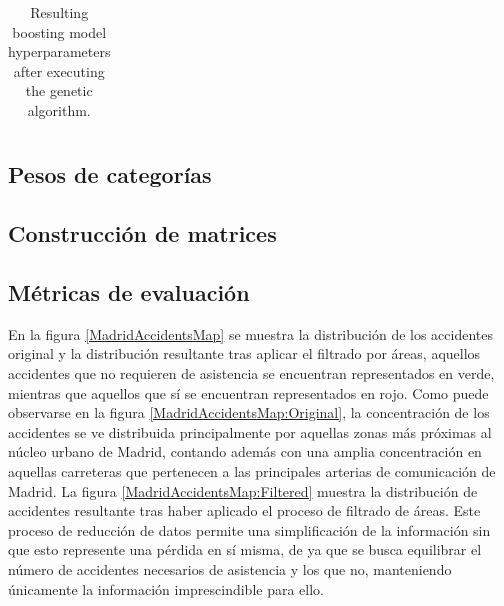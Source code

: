 \documentclass{uathesis-es}
\begin{document}
{\begin{table}[H]
\begin{center}
\begin{tabular}{|c||c|c|c|}
		\end{tabular}
	\end{center}
	\caption{Resulting boosting model hyperparameters after executing the genetic algorithm.}
	\label{ResultingHyperparamsXGBoost}
\end{table}

\subsection{Pesos de categorías}

\subsection{Construcción de matrices}

\subsection{Métricas de evaluación}



En la figura \ref{MadridAccidentsMap} se muestra la distribución de los accidentes original y la distribución resultante tras aplicar el filtrado por áreas, aquellos accidentes que no requieren de asistencia se encuentran representados en verde, mientras que aquellos que sí se encuentran representados en rojo. Como puede observarse en la figura \ref{MadridAccidentsMap:Original}, la concentración de los accidentes se ve distribuida principalmente por aquellas zonas más próximas al núcleo urbano de Madrid, contando además con una amplia concentración en aquellas carreteras que pertenecen a las principales arterias de comunicación de Madrid. La figura  \ref{MadridAccidentsMap:Filtered} muestra la distribución de accidentes resultante tras haber aplicado el proceso de filtrado de áreas. Este proceso de reducción de datos permite una simplificación de la información sin que esto represente una pérdida en sí misma, de ya que se busca equilibrar el número de accidentes necesarios de asistencia y los que no, manteniendo únicamente la información imprescindible para ello.

}
\end{document}

